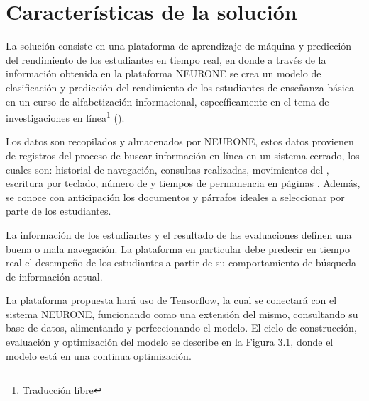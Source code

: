 \section{Características de la solución}
\label{sec:caracteristicas-solucion}

La solución consiste en una plataforma de aprendizaje de máquina y predicción del rendimiento de los estudiantes en tiempo real, en donde a través de la información obtenida en la plataforma NEURONE se crea un modelo de clasificación y predicción del rendimiento de los estudiantes de enseñanza básica en un curso de alfabetización informacional, específicamente en el tema de investigaciones en línea\footnote{Traducción libre} (). 

Los datos son recopilados y almacenados por NEURONE, estos datos provienen de registros del proceso de buscar información en línea en un sistema cerrado, los cuales son: historial de navegación, consultas realizadas, movimientos del , escritura por teclado, número de  y tiempos de permanencia en páginas . Además, se conoce con anticipación los documentos y párrafos ideales a seleccionar por parte de los estudiantes.

La información de los estudiantes y el resultado de las evaluaciones definen una buena o mala navegación. La plataforma en particular debe predecir en tiempo real el desempeño de los estudiantes a partir de su comportamiento de búsqueda de información actual.

La plataforma propuesta hará uso de Tensorflow, la cual se conectará con el sistema NEURONE, funcionando como una extensión del mismo, consultando su base de datos, alimentando y perfeccionando el modelo. El ciclo de construcción, evaluación y optimización del modelo se describe en la Figura 3.1, donde el modelo está en una continua optimización.
